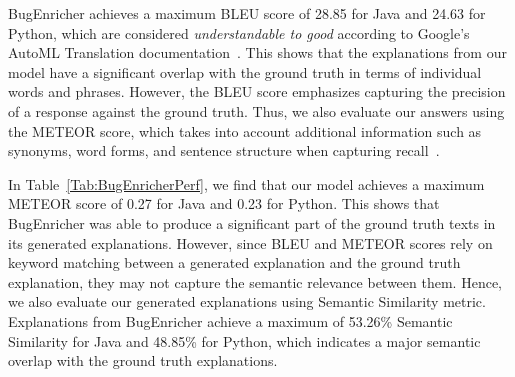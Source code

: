 BugEnricher achieves a maximum \acrshort{BLEU} score of 28.85 for Java and 24.63 for Python, which are considered \textit{understandable to good} according to Google’s AutoML Translation documentation~\cite{automldoc}. This shows that the explanations from our model have a significant overlap with the ground truth in terms of individual words and phrases. However, the \acrshort{BLEU} score emphasizes capturing the precision of a response against the ground truth. Thus, we also evaluate our answers using the \acrshort{METEOR} score, which takes into account additional information such as synonyms, word forms, and sentence structure when capturing recall~\cite{banerjee2005meteor}.\par

In Table~\ref{Tab:BugEnricherPerf}, we find that our model achieves a maximum \acrshort{METEOR} score of 0.27 for Java and 0.23 for Python. This shows that BugEnricher was able to produce a significant part of the ground truth texts in its generated explanations. However, since \acrshort{BLEU} and \acrshort{METEOR} scores rely on keyword matching between a generated explanation and the ground truth explanation, they may not capture the semantic relevance between them. Hence, we also evaluate our generated explanations using \acrfull{Semantic Similarity} metric. Explanations from BugEnricher achieve a maximum of 53.26\% \acrfull{Semantic Similarity} for Java and 48.85\% for Python, which indicates a major semantic overlap with the ground truth explanations.

\renewcommand{\arraystretch}{1.1}
\begin{table}[!t]
\centering
\caption{Performance of BugEnricher}
\label{Tab:BugEnricherPerf}
\end{table}

